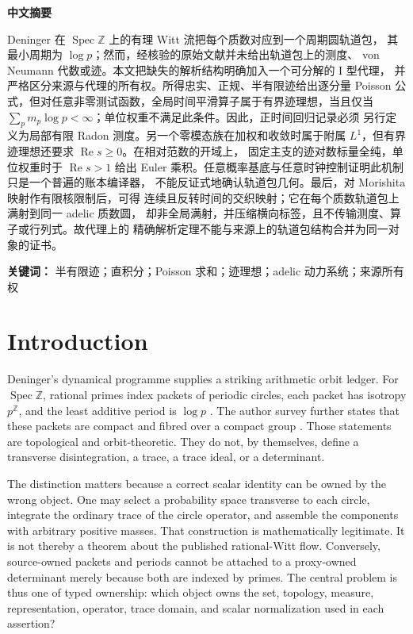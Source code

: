 \documentclass[11pt,a4paper]{article}
\theoremstyle{definition}
\newcommand{\Z}{\mathbb Z}
\newcommand{\Spec}{\operatorname{Spec}}
\begin{document}
\vspace{1em}
\begin{center}
  {\large\bfseries 中文摘要}
\end{center}
\noindent
Deninger 在 $\Spec\Z$ 上的有理 Witt 流把每个质数对应到一个周期圆轨道包，
其最小周期为 $\log p$；然而，经核验的原始文献并未给出轨道包上的测度、
von Neumann 代数或迹。本文把缺失的解析结构明确加入一个可分解的 I 型代理，
并严格区分来源与代理的所有权。所得忠实、正规、半有限迹给出逐分量 Poisson
公式，但对任意非零测试函数，全局时间平滑算子属于有界迹理想，当且仅当
$\sum_p m_p\log p<\infty$；单位权重不满足此条件。因此，正时间回归记录必须
另行定义为局部有限 Radon 测度。另一个零模态族在加权和收敛时属于附属
$L^1$，但有界迹理想还要求 $\operatorname{Re}s\geq0$。在相对范数的开域上，
固定主支的迹对数标量全纯，单位权重时于 $\operatorname{Re}s>1$ 给出 Euler
乘积。任意概率基底与任意时钟控制证明此机制只是一个普遍的账本编译器，
不能反证式地确认轨道包几何。最后，对 Morishita 映射作有限核限制后，可得
连续且反转时间的交织映射；它在每个质数轨道包上满射到同一 adelic 质数圆，
却非全局满射，并压缩横向标签，且不传输测度、算子或行列式。故代理上的
精确解析定理不能与来源上的轨道包结构合并为同一对象的证书。

\noindent\textbf{关键词：} 半有限迹；直积分；Poisson 求和；迹理想；adelic
动力系统；来源所有权

\tableofcontents

\section{Introduction}

Deninger's dynamical programme supplies a striking arithmetic orbit ledger.
For $\Spec\Z$, rational primes index packets of periodic circles, each packet
has isotropy $p^{\Z}$, and the least additive period is $\log p$
\citep[Theorems 5.2 and 6.1]{Deninger2026}.  The author survey further states
that these packets are compact and fibred over a compact group
\citep[Theorem 4.2]{Deninger2023}.  Those statements are topological and
orbit-theoretic.  They do not, by themselves, define a transverse
disintegration, a trace, a trace ideal, or a determinant.

The distinction matters because a correct scalar identity can be owned by the
wrong object.  One may select a probability space transverse to each circle,
integrate the ordinary trace of the circle operator, and assemble the
components with arbitrary positive masses.  That construction is mathematically
legitimate.  It is not thereby a theorem about the published rational-Witt
flow.  Conversely, source-owned packets and periods cannot be attached to a
proxy-owned determinant merely because both are indexed by primes.  The
central problem is thus one of typed ownership: which object owns the set,
topology, measure, representation, operator, trace domain, and scalar
normalization used in each assertion?
\end{document}
